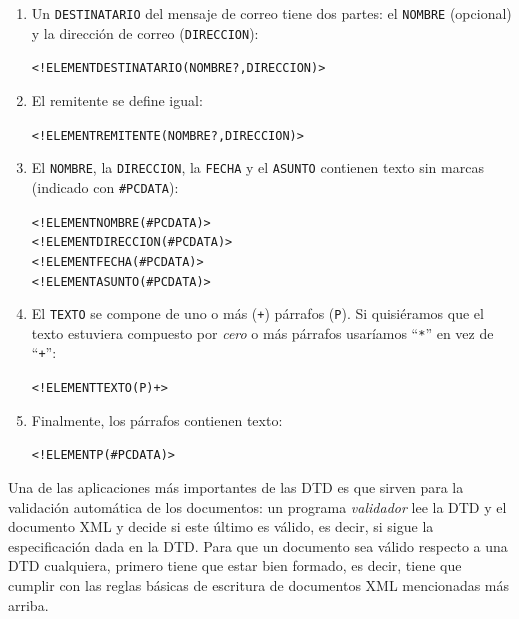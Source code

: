 \begin{enumerate}
\item Un \texttt{DESTINATARIO} del mensaje de correo tiene dos partes: el \texttt{NOMBRE} (opcional) y la dirección de correo (\texttt{DIRECCION}): \begin{small}\begin{alltt} <!ELEMENT DESTINATARIO (NOMBRE?, DIRECCION)> \end{alltt}\end{small} \item El remitente se define igual: \begin{small}\begin{alltt} <!ELEMENT REMITENTE (NOMBRE?, DIRECCION)> \end{alltt}\end{small} \item El \texttt{NOMBRE}, la \texttt{DIRECCION}, la \texttt{FECHA} y el \texttt{ASUNTO} contienen texto sin marcas (indicado con \texttt{\#PCDATA}): 
\begin{small}\begin{alltt} 
<!ELEMENT NOMBRE (#PCDATA)> 
<!ELEMENT DIRECCION (#PCDATA)> 
<!ELEMENT FECHA (#PCDATA)> 
<!ELEMENT ASUNTO (#PCDATA)> \end{alltt}\end{small} 

\item El \texttt{TEXTO} se compone de uno o más (\texttt{+}) párrafos (\texttt{P}). Si quisiéramos que el texto estuviera compuesto por \emph{cero} o más párrafos usaríamos ``\texttt{*}'' en vez de ``\texttt{+}'': \begin{small}\begin{alltt} <!ELEMENT TEXTO (P)+> \end{alltt}\end{small} 

\item Finalmente, los párrafos contienen texto: \begin{small}\begin{alltt} <!ELEMENT P (#PCDATA)> \end{alltt}\end{small} \end{enumerate} 

Una de las aplicaciones más importantes de las DTD es que sirven para la validación automática de los documentos: un programa \emph{validador} lee la DTD y el documento XML y decide si este último es válido, es decir, si sigue la especificación dada en la DTD. Para que un documento sea válido respecto a una DTD cualquiera, primero tiene que estar bien formado, es decir, tiene que cumplir con las reglas básicas de escritura de documentos XML mencionadas más arriba. 

